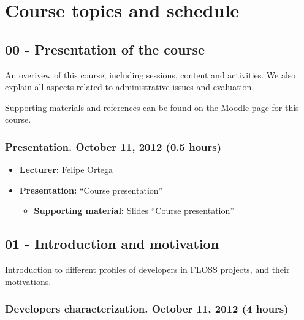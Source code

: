 \documentclass[a4paper]{article}
\begin{document}
\section{Course topics and schedule}

\subsection{00 - Presentation of the course}

An overivew of this course, including sessions, content and activities. We also explain all aspects related to administrative issues and evaluation.

Supporting materials and references can be found on the Moodle page for this course.

\subsubsection{Presentation. October 11, 2012 (0.5 hours)}

\begin{itemize}
\item \textbf{Lecturer:} Felipe Ortega
\item \textbf{Presentation:} ``Course presentation''
  \begin{itemize}
  \item \textbf{Supporting material:} Slides ``Course presentation''
  \end{itemize}
\end{itemize}

\subsection{01 - Introduction and motivation}

Introduction to different profiles of developers in FLOSS projects, and their motivations.

\subsubsection{Developers characterization. October 11, 2012 (4 hours)}
\end{document}
